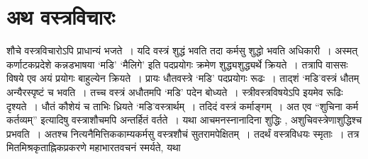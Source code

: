 {\section*{अथ वस्त्रविचारः}

शौचे वस्त्रविचारोऽपि प्राधान्यं भजते~। यदि वस्त्रं शुद्धं भवति तदा कर्मसु शुद्धो भवति अधिकारी~। अस्मत् कर्णाटकप्रदेशे कन्नडभाषया ‘मडि’ ‘मैलिगे’ इति पदप्रयोगः क्रमेण शुद्ध्यशुद्ध्यर्थे क्रियते~। तत्रापि वाससः विषये एव अयं प्रयोगः बाहुल्येन क्रियते~। प्रायः धौतवस्त्रे ‘मडि’ पदप्रयोगः रूढः~। ताद्शं ‘मडि’वस्त्रं धौतम् अन्यैरस्पृष्टं च भवति~। तच्च वस्त्रं अधौतमपि ‘मडि’ पदेन बोध्यते~। स्त्रीवस्त्रविषयेऽपि इयमेव रूढिः दृश्यते~। धौतं कौशेयं च ताभिः ध्रियते ‘मडि’वस्त्रार्थम्~। तदिदं वस्त्रं कर्माङ्गम्~। अत एव “शुचिना कर्म कर्तव्यम्” इत्यादिषु वस्त्राशौचमपि अन्तर्हितं वर्तते~। यथा आचमनस्नानादिना शुद्धिः , अशुचिवस्त्रेणाशुद्धिश्च प्रभवति~। अतश्च नित्यनैमित्तिककाम्यकर्मसु वस्त्रशौचं सुतरामपेक्षितम्~। तदर्थं वस्त्रविधयः स्मृताः~। तत्र मितमिश्रकृताह्निकप्रकरणे महाभारतवचनं स्मर्यते, यथा

}
